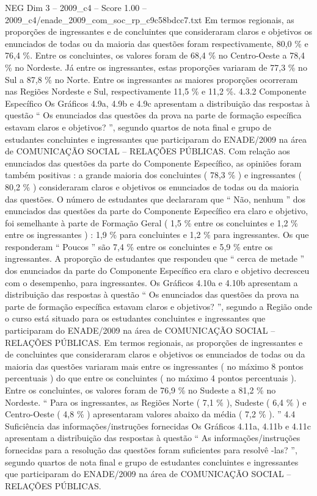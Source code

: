 \begin{textsample}{NEG Dim 3 – 2009\_c4 – Score 1.00 – 2009\_c4/enade\_2009\_com\_soc\_rp\_c9c58bdcc7.txt}
Em termos regionais, as proporções de ingressantes e de concluintes que consideraram claros e objetivos os enunciados de todas ou da maioria das questões foram respectivamente, 80,0 \% e 76,4 \%.
Entre os concluintes, os valores foram de 68,4 \% no Centro-Oeste a 78,4 \% no Nordeste.
Já entre os ingressantes, estas proporções variaram de 77,3 \% no Sul a 87,8 \% no Norte.
Entre os ingressantes as maiores proporções ocorreram nas Regiões Nordeste e Sul, respectivamente 11,5 \% e 11,2 \%. 4.3.2 Componente Específico Os Gráficos 4.9a, 4.9b e 4.9c apresentam a distribuição das respostas à questão “ Os enunciados das questões da prova na parte de formação específica estavam claros e objetivos? ”, segundo quartos de nota final e grupo de estudantes concluintes e ingressantes que participaram do ENADE/2009 na área de COMUNICAÇÃO SOCIAL – RELAÇÕES PÚBLICAS.
Com relação aos enunciados das questões da parte do Componente Específico, as opiniões foram também positivas : a grande maioria dos concluintes ( 78,3 \% ) e ingressantes ( 80,2 \% ) consideraram claros e objetivos os enunciados de todas ou da maioria das questões.
O número de estudantes que declararam que “ Não, nenhum ” dos enunciados das questões da parte do Componente Específico era claro e objetivo, foi semelhante à parte de Formação Geral ( 1,5 \% entre os concluintes e 1,2 \% entre os ingressantes ) : 1,9 \% para concluintes e 1,2 \% para ingressantes.
Os que responderam “ Poucos ” são 7,4 \% entre os concluintes e 5,9 \% entre os ingressantes.
A proporção de estudantes que respondeu que “ cerca de metade ” dos enunciados da parte do Componente Específico era claro e objetivo decresceu com o desempenho, para ingressantes.
Os Gráficos 4.10a e 4.10b apresentam a distribuição das respostas à questão “ Os enunciados das questões da prova na parte de formação específica estavam claros e objetivos? ”, segundo a Região onde o curso está situado para os estudantes concluintes e ingressantes que participaram do ENADE/2009 na área de COMUNICAÇÃO SOCIAL – RELAÇÕES PÚBLICAS.
Em termos regionais, as proporções de ingressantes e de concluintes que consideraram claros e objetivos os enunciados de todas ou da maioria das questões variaram mais entre os ingressantes ( no máximo 8 pontos percentuais ) do que entre os concluintes ( no máximo 4 pontos percentuais ).
Entre os concluintes, os valores foram de 76,9 \% no Sudeste a 81,2 \% no Nordeste. “ Para os ingressantes, as Regiões Norte ( 7,1 \% ), Sudeste ( 6,4 \% ) e Centro-Oeste ( 4,8 \% ) apresentaram valores abaixo da média ( 7,2 \% ). ” 4.4 Suficiência das informações/instruções fornecidas Os Gráficos 4.11a, 4.11b e 4.11c apresentam a distribuição das respostas à questão “ As informações/instruções fornecidas para a resolução das questões foram suficientes para resolvê -las? ”, segundo quartos de nota final e grupo de estudantes concluintes e ingressantes que participaram do ENADE/2009 na área de COMUNICAÇÃO SOCIAL – RELAÇÕES PÚBLICAS.

\end{textsample}
